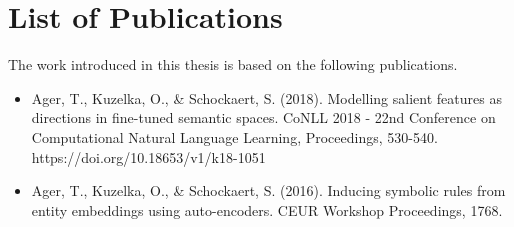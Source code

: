 \newpage
\chapter*{List of Publications}

The work introduced in this thesis is based on the following publications.

\begin{itemize} 

\item Ager, T., Kuzelka, O., \& Schockaert, S. (2018). Modelling salient features as directions in fine-tuned semantic spaces. CoNLL 2018 - 22nd Conference on Computational Natural Language Learning, Proceedings, 530-540. https://doi.org/10.18653/v1/k18-1051

\item Ager, T., Kuzelka, O., \& Schockaert, S. (2016). Inducing symbolic rules from entity embeddings using auto-encoders. CEUR Workshop Proceedings, 1768.

\end{itemize}